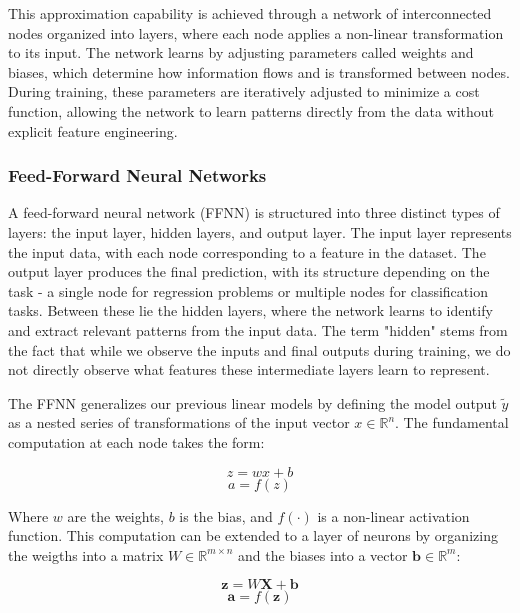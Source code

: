 \documentclass[aps,pra,english,notitlepage,reprint,nofootinbib]{revtex4-1}  %
\begin{document}
This approximation capability is achieved through a network of interconnected nodes organized into layers, where each node applies a non-linear transformation to its input. The network learns by adjusting parameters called weights and biases, which determine how information flows and is transformed between nodes. During training, these parameters are iteratively adjusted to minimize a cost function, allowing the network to learn patterns directly from the data without explicit feature engineering.

\subsubsection{Feed-Forward Neural Networks}

A feed-forward neural network (FFNN) is structured into three distinct types of layers: the input layer, hidden layers, and output layer. The input layer represents the input data, with each node corresponding to a feature in the dataset. The output layer produces the final prediction, with its structure depending on the task - a single node for regression problems or multiple nodes for classification tasks. Between these lie the hidden layers, where the network learns to identify and extract relevant patterns from the input data. The term "hidden" stems from the fact that while we observe the inputs and final outputs during training, we do not directly observe what features these intermediate layers learn to represent.

The FFNN generalizes our previous linear models by defining the model output \( \tilde{y} \) as a nested series of transformations of the input vector \(x \in \mathbb{R}^{n} \). The fundamental computation at each node takes the form:

\begin{equation}
    z = wx +b
\end{equation}
\begin{equation}
    a = f(z)
\end{equation}

Where \( w \) are the weights, \( b \) is the bias, and \( f(\cdot) \) is a non-linear activation function. This computation can be extended to a layer of neurons by organizing the weigths into a matrix \( W \in \mathbb{R}^{m\times n} \) and the biases into a vector \( \mathbf{b} \in \mathbb{R}^m \):

\begin{equation}
    \mathbf{z} = W\mathbf{X} + \mathbf{b}
\end{equation}
\begin{equation}
    \mathbf{a} = f(\mathbf{z})
\end{equation}
\end{document}
